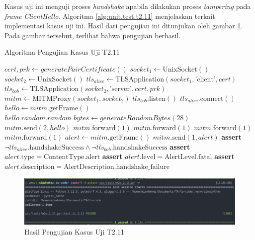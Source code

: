 Kasus uji ini menguji proses \emph{handshake} apabila dilakukan proses \emph{tampering} pada \emph{frame} \emph{ClientHello}. Algoritma \ref{alg:unit.test.t2.11} menjelaskan terkait implementasi kasus uji ini. Hasil dari pengujian ini ditunjukan oleh gambar \ref{fig:unit.test.t2.11}. Pada gambar tersebut, terlihat bahwa pengujian berhasil.

\begin{algorithm}
  \caption{Algoritma Pengujian Kasus Uji T2.11}
  \label{alg:unit.test.t2.11}
  \begin{algorithmic}
    \State $cert, prk \gets generatePairCertificate()$
    \State $socket_1 \gets \text{UnixSocket}()$
    \State $socket_2 \gets \text{UnixSocket}()$
    \State $tls_{alice} \gets \text{TLSApplication}(socket_1, \text{'client'}, cert)$ 
    \State $tls_{bob} \gets \text{TLSApplication}(socket_2, \text{'server'}, cert, prk)$
    \State $mitm \gets \text{MITMProxy}(socket_1, socket_2)$
    \State
    \State $tls_{bob}.\text{listen}()$  
    \State $tls_{alice}.\text{connect}()$  
    \State
    \State $hello \gets mitm.\text{getFrame}()$ 
    \State $hello.random.random\_bytes \gets generateRandomBytes(28)$
    \State $mitm.\text{send}(2, hello)$
    \State
    \State $mitm.\text{forward}(1)$ 
    \State $mitm.\text{forward}(1)$ 
    \State $mitm.\text{forward}(1)$ 
    \State $mitm.\text{forward}(1)$ 
    \State
    \State $alert \gets mitm.\text{getFrame}()$
    \State $mitm.\text{send}(1, alert)$
    \State
    \State \textbf{assert} $\lnot tls_{alice}.\text{handshakeSuccess} \land \lnot tls_{bob}.\text{handshakeSuccess}$
    \State \textbf{assert} $alert.\text{type} = \text{ContentType.alert}$
    \State \textbf{assert} $alert.\text{level} = \text{AlertLevel.fatal}$
    \State \textbf{assert} $alert.\text{description} = \text{AlertDescription.handshake\_failure}$
  \end{algorithmic}
\end{algorithm}

\begin{figure}[ht]
  \centering
  \includegraphics[width=\textwidth]{chapters/res/appendix-4/2.11.png}
  \caption{Hasil Pengujian Kasus Uji T2.11}
  \label{fig:unit.test.t2.11}
\end{figure}

